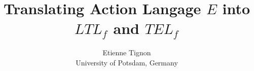 \documentclass[a4paper]{article}
\begin{document}
\title{Translating Action Langage $E$ into $LTL_f$ and $TEL_f$}

\author{%
  Etienne Tignon\\
  University of Potsdam, Germany
}

\maketitle


%
%
%
%
%
%
%
%
%



\printbibliography{}
\end{document}
